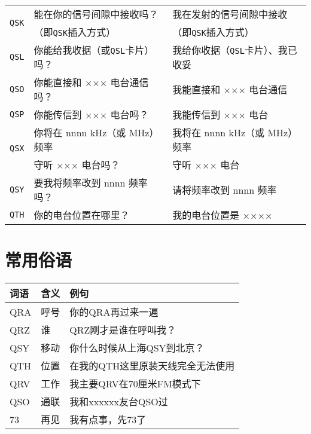 \begin{longtable}{|l|l|l|}
  \hline
  \multirow{2}{1em}{\texttt{QSK}} & 能在你的信号间隙中接收吗？                         & 我在发射的信号间隙中接收                          \\
                                  & （即\texttt{QSK}插入方式）                   & （即\texttt{QSK}插入方式）                   \\
  \hline
  \texttt{QSL}                    & 你能给我收据（或\texttt{QSL}卡片）吗？             & 我给你收据（\texttt{QSL}卡片）、我已收妥            \\
  \hline
  \texttt{QSO}                    & 你能直接和 ××× 电台通信吗？                      & 我能直接和 ××× 电台通信                        \\
  \hline
  \texttt{QSP}                    & 你能传信到 ××× 电台吗？                        & 我能传信到 ××× 电台                          \\
  \hline
  \multirow{2}{1em}{\texttt{QSX}} & 你将在 nnnn \unit{\kHz}（或 \unit{\MHz}）频率 & 我将在 nnnn \unit{\kHz}（或 \unit{\MHz}）频率 \\
                                  & 守听 ××× 电台吗？                           & 守听 ××× 电台                             \\
  \hline
  \texttt{QSY}                    & 要我将频率改到 nnnn 频率吗？                     & 请将频率改到 nnnn 频率                        \\
  \hline
  \texttt{QTH}                    & 你的电台位置在哪里？                            & 我的电台位置是 ××××                          \\
  \hline
\end{longtable}

\newpage

\section{常用俗语}

\begin{longtable}{|l|l|l|}
  \hline
  \textbf{词语} & \textbf{含义} & \textbf{例句}        \\
  \hline
  QRA         & 呼号          & 你的QRA再过来一遍         \\
  \hline
  QRZ         & 谁           & QRZ刚才是谁在呼叫我？       \\
  \hline
  QSY         & 移动          & 你什么时候从上海QSY到北京？    \\
  \hline
  QTH         & 位置          & 在我的QTH这里原装天线完全无法使用 \\
  \hline
  QRV         & 工作          & 我主要QRV在70厘米FM模式下   \\
  \hline
  QSO         & 通联          & 我和xxxxxx友台QSO过     \\
  \hline
  73          & 再见          & 我有点事，先73了          \\
  \hline
\end{longtable}

